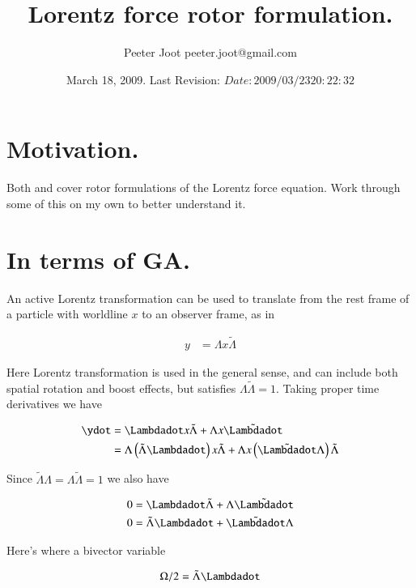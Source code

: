\documentclass{article}
\title{ Lorentz force rotor formulation. }
\author{Peeter Joot \quad peeter.joot@gmail.com }
\date{ March 18, 2009.  Last Revision: $Date: 2009/03/23 20:22:32 $ }
\newcommand{\reverse}[1]{\tilde{{#1}}}
\begin{document}
\maketitle{}
\tableofcontents

\section{ Motivation. }

Both \cite{baylis-2007} and \cite{doran2003gap} cover rotor formulations
of the Lorentz force equation.  Work through some of this on my own to 
better understand it.

\section{ In terms of GA. }

An active Lorentz transformation can be used to translate from the rest frame of a particle with worldline $x$ to 
an observer frame, as in

\begin{align}\label{eqn:LorentzTx}
y &= \Lambda x \reverse{\Lambda}
\end{align}

Here Lorentz transformation is used in the general sense, and can include both spatial rotation and boost effects, but satisfies $\Lambda\reverse{\Lambda} = 1$.  Taking proper time derivatives we have

\begin{align*}
\ydot 
&= \Lambdadot x \reverse{\Lambda} + \Lambda x \reverse{\Lambdadot} \\
&= \Lambda \left(\reverse{\Lambda} \Lambdadot\right) x \reverse{\Lambda} + \Lambda x \left(\reverse{\Lambdadot} \Lambda \right) \reverse{\Lambda} \\
\end{align*}

Since $\reverse{\Lambda}\Lambda = \Lambda\reverse{\Lambda} = 1$ we also have

\begin{align*}
0 &= \Lambdadot\reverse{\Lambda} + \Lambda\reverse{\Lambdadot}  \\
0 &= \reverse{\Lambda}\Lambdadot + \reverse{\Lambdadot}\Lambda
\end{align*}

Here's where a bivector variable 

\begin{align}
\Omega/2 = \reverse{\Lambda} \Lambdadot
\end{align}
\end{document}
